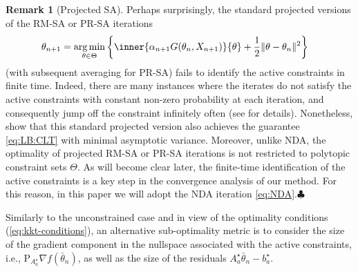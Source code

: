\documentclass[11pt,a4paper]{article}
\theoremstyle{definition}
\newtheorem{remark}[theorem]{Remark}
\DeclareMathOperator*{\argmin}{arg\,min}
\begin{document}
\begin{remark}[Projected SA]
\label{remark:projectedSA}
Perhaps surprisingly, the standard projected versions of the RM-SA or PR-SA iterations
\begin{align*}
    \theta_{n+1} &= \argmin_{\theta \in \Theta} \left\{ \inner{\alpha_{n+1} G(\theta_n, X_{n+1})}{\theta} +\frac{1}{2} \| \theta - \theta_{n} \|^2\right\}
\end{align*}
(with subsequent averaging for PR-SA) fails to identify the active constraints in finite time. Indeed, there are many instances where the iterates do not satisfy the active constraints with constant non-zero probability at each iteration, and consequently jump off the constraint infinitely often (see \cite{lee2012manifold,duchi2021asymptotic} for details). Nonetheless, \citet{davis2023asymptotic} show that this standard projected version also achieves the guarantee \eqref{eq:LB:CLT} with minimal asymptotic variance. Moreover, unlike NDA, the optimality of projected RM-SA or PR-SA iterations is not restricted to polytopic constraint sets $\Theta$. As will become clear later, the finite-time identification of the active constraints is a key step in the convergence analysis of our method. For this reason, in this paper we will adopt the NDA iteration \eqref{eq:NDA}.\hfill $\clubsuit$
\end{remark}

Similarly to the unconstrained case and in view of the optimality conditions (\ref{eq:kkt-conditions}), an alternative sub-optimality metric is to consider the size of the gradient component in the nullspace associated with the active constraints, i.e., $\text{P}_{A^\star_{a}} \nabla {f}(\bar{\theta}_n)$, as well as the size of the residuals $A^\star_a\bar\theta_n-b^\star_a$.
\end{document}
